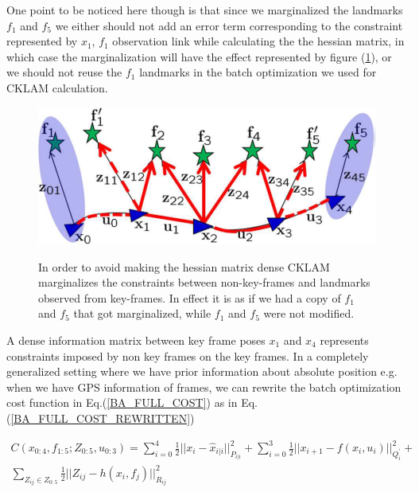 One point to be noticed here though is that since we marginalized the landmarks $f_1$ and $f_5$ we either should not add an error term corresponding to the constraint represented by $x_1$, $f_1$ observation link while calculating the the hessian matrix, in which case the marginalization will have the effect represented by figure (\ref{fig:CKLAMMarginalizationFeatureClone}), or we should not reuse the $f_1$ landmarks in the batch optimization we used for CKLAM calculation. 

\begin{figure}[ht]
	\centering
		\includegraphics[width=1.00\textwidth]{images/CKLAMMarginalizationFeatureClone.png}
	\label{fig:CKLAMMarginalizationFeatureClone}
  \caption{In order to avoid making the hessian matrix dense CKLAM marginalizes the constraints between non-key-frames and landmarks observed from key-frames. In effect it is as if we had a copy of $f_1$ and $f_5$ that got marginalized, while $f_1$ and $f_5$ were not modified. \cite{CKLAM}}
\end{figure}

A dense information matrix between key frame poses $x_1$ and $x_4$ represents constraints imposed by non key frames on the key frames. In a completely generalized setting where we have prior information about absolute position e.g. when we have GPS information of frames, we can rewrite the batch optimization cost function in Eq.(\ref{BA_FULL_COST}) as in Eq.(\ref{BA_FULL_COST_REWRITTEN})

\begin{equation}
  \begin{split}
    C(x_{0:4},f_{1:5};Z_{0:5},u_{0:3}) = \sum_{i=0}^4 \frac{1}{2}||x_i-\hat x_{i|i}||^2_{P_{i|i}} + \sum_{i=0}^3 {\frac{1}{2}||x_{i+1} - f(x_i, u_i)||^2_{Q_i^{'}}} +\\ \sum_{Z_{ij}\in Z_{0:5}} {\frac{1}{2}||Z_{ij}-h(x_i,f_j)||^2_{R_{ij}}}
    \label{BA_FULL_COST_REWRITTEN}
  \end{split}
\end{equation}

